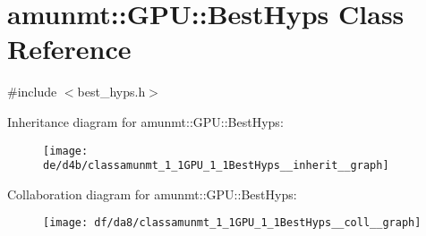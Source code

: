 \hypertarget{classamunmt_1_1GPU_1_1BestHyps}{}\section{amunmt\+:\+:G\+PU\+:\+:Best\+Hyps Class Reference}
\label{classamunmt_1_1GPU_1_1BestHyps}


{\ttfamily \#include $<$best\+\_\+hyps.\+h$>$}



Inheritance diagram for amunmt\+:\+:G\+PU\+:\+:Best\+Hyps\+:
\nopagebreak
\begin{figure}[H]
\begin{center}
\leavevmode
\texttt{[image: de/d4b/classamunmt\_1\_1GPU\_1\_1BestHyps\_\_inherit\_\_graph]}
\end{center}
\end{figure}


Collaboration diagram for amunmt\+:\+:G\+PU\+:\+:Best\+Hyps\+:
\nopagebreak
\begin{figure}[H]
\begin{center}
\leavevmode
\texttt{[image: df/da8/classamunmt\_1\_1GPU\_1\_1BestHyps\_\_coll\_\_graph]}
\end{center}
\end{figure}
